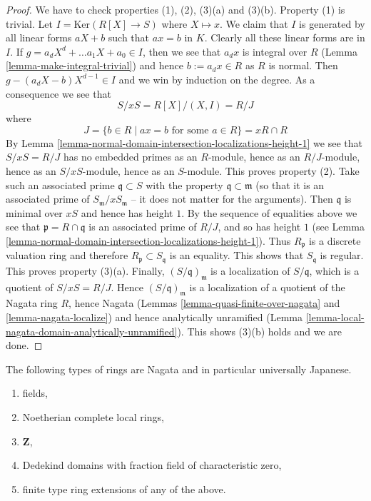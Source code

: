 \begin{proof}
\medskip\noindent
We have to check properties (1), (2), (3)(a) and (3)(b).
Property (1) is trivial.
Let $I = \text{Ker}(R[X] \to S)$ where $X \mapsto x$.
We claim that $I$ is generated by all linear forms $aX + b$ such that
$ax = b$ in $K$. Clearly all these linear forms are in $I$.
If $g = a_d X^d + \ldots a_1 X + a_0 \in I$, then we see that
$a_dx$ is integral over $R$ (Lemma \ref{lemma-make-integral-trivial})
and hence $b := a_dx \in R$
as $R$ is normal. Then $g - (a_dX - b)X^{d - 1} \in I$ and we win by
induction on the degree. As a consequence we see that
$$
S/xS = R[X]/(X, I) = R/J
$$
where
$$
J = \{b \in R \mid ax = b \text{ for some }a \in R\} = xR \cap R
$$
By Lemma \ref{lemma-normal-domain-intersection-localizations-height-1}
we see that $S/xS = R/J$ has no embedded primes as an $R$-module, hence as
an $R/J$-module, hence as an $S/xS$-module, hence as an $S$-module.
This proves property (2).
Take such an associated prime $\mathfrak q \subset S$ with the
property $\mathfrak q \subset \mathfrak m$ (so that it is an
associated prime of $S_{\mathfrak m}/xS_{\mathfrak m}$ -- it does not
matter for the arguments).
Then $\mathfrak q$ is minimal over $xS$ and hence has height $1$.
By the sequence of equalities above we see that
$\mathfrak p = R \cap \mathfrak q$ is an associated
prime of $R/J$, and so has height $1$
(see Lemma \ref{lemma-normal-domain-intersection-localizations-height-1}).
Thus $R_{\mathfrak p}$ is a discrete valuation ring and therefore
$R_{\mathfrak p} \subset S_{\mathfrak q}$ is an equality. This shows
that $S_{\mathfrak q}$ is regular. This proves property (3)(a).
Finally, $(S/\mathfrak q)_{\mathfrak m}$ is a localization
of $S/\mathfrak q$, which is a quotient of $S/xS = R/J$.
Hence $(S/\mathfrak q)_{\mathfrak m}$ is a localization of
a quotient of the Nagata ring $R$, hence
Nagata (Lemmas \ref{lemma-quasi-finite-over-nagata}
and \ref{lemma-nagata-localize})
and hence analytically unramified
(Lemma \ref{lemma-local-nagata-domain-analytically-unramified}).
This shows (3)(b) holds and we are done.
\end{proof}

\begin{proposition}
\label{proposition-ubiquity-nagata}
The following types of rings are Nagata and in particular universally Japanese.
\begin{enumerate}
\item fields,
\item Noetherian complete local rings,
\item $\mathbf{Z}$,
\item Dedekind domains with fraction field of characteristic zero,
\item finite type ring extensions of any of the above.
\end{enumerate}
\end{proposition}

